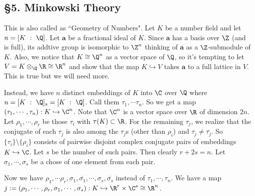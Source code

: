 \subsection*{\S 5. Minkowski Theory}

This is also called as ``Geometry of Numbers". Let $K$ be a number field and let $n = [K \ : \ \Q]$. Let $\mathbf{a}$ be a fractional ideal of $K$. Since $\mathbf{a}$ has a basis over $\Z$ (and is full), its addtive group is isomorphic to $\Z^n$ thinking of $\mathbf{a}$ as a $\Z$-submodule of $K$. Also, we notice that $K \cong \Q^n$ as a vector space of $\Q$, so it's tempting to let $V = K \otimes_\Q \R \cong \R^n$ and show that the map $K \hookrightarrow V$ takes $\mathbf{a}$ to a full lattice in $V$. This is true but we will need more.

Instead, we have $n$ distinct embeddings of $K$ into $\C$ over $\Q$ where $n = [K \ : \ \Q]_s = [K \ : \ \Q]$. Call them $\tau_1, \cdots \tau_n$. So we get a map $(\tau_1, \cdots, \tau_n): K \hookrightarrow \C^n$. Note that $\C^n$ is a vector space over $\R$ of dimension $2n$. Let $\rho_1, \cdots, \rho_r$ be those $\tau_i$ with $\tau(K) \subset \R$. For the remaining $\tau_j$, we realize that the conjugate of each $\tau_j$ is also among the $\tau_j$s (other than $\rho_i$) and $\tau_j \neq \overline{\tau_j}$. So $\{\tau_i\}\setminus\{\rho_i\}$ consists of pairwise disjoint complex conjugate pairs of embeddings $K \hookrightarrow \C$. Let $s$ be the number of such pairs. Then clearly $r+2s = n$. Let $\sigma_1, \cdots, \sigma_s$ be a chose of one element from each pair.

Now we have $\rho_1, \cdots \rho_r, \sigma_1, \overline{\sigma_1}, \cdots, \sigma_s, \overline{\sigma_s}$ instead of $\tau_1, \cdots, \tau_n$. We have a map $j:=(\rho_1, \cdots, \rho_r, \sigma_1, \cdots, \sigma_s): K \hookrightarrow \R^r\times \C^s \cong \R^n$.
\clearpage